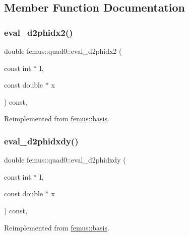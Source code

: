 \subsection{Member Function Documentation}
\mbox{\label{classfemus_1_1quad0_ab862ac9e1b07aa072f566a753b1948a8}} 
\subsubsection{\texorpdfstring{eval\+\_\+d2phidx2()}{eval\_d2phidx2()}}
{\footnotesize\ttfamily double femus\+::quad0\+::eval\+\_\+d2phidx2 (\begin{DoxyParamCaption}\item[{const int $\ast$}]{I,  }\item[{const double $\ast$}]{x }\end{DoxyParamCaption}) const\hspace{0.3cm}{\ttfamily [inline]}, {\ttfamily [virtual]}}



Reimplemented from \mbox{\hyperlink{classfemus_1_1basis_a0a9839e75d1c9c8302486fc072eed028}{femus\+::basis}}.

\mbox{\label{classfemus_1_1quad0_aa1987456dd6bdacb2b9038c21bc17566}} 
\subsubsection{\texorpdfstring{eval\+\_\+d2phidxdy()}{eval\_d2phidxdy()}}
{\footnotesize\ttfamily double femus\+::quad0\+::eval\+\_\+d2phidxdy (\begin{DoxyParamCaption}\item[{const int $\ast$}]{I,  }\item[{const double $\ast$}]{x }\end{DoxyParamCaption}) const\hspace{0.3cm}{\ttfamily [inline]}, {\ttfamily [virtual]}}



Reimplemented from \mbox{\hyperlink{classfemus_1_1basis_ac9feaf9e60421143db2a3708f3c7fa48}{femus\+::basis}}.

